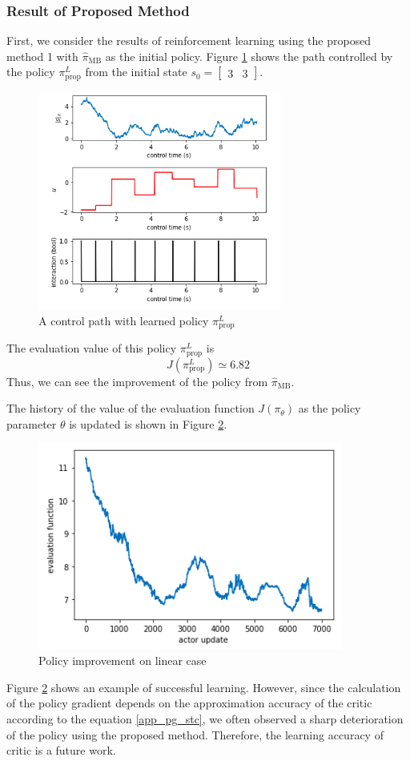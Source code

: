 \documentclass[english, dvipdfmx]{ampmt}             %
\begin{document}
\subsubsection{Result of Proposed Method}
First, we consider the results of reinforcement learning using the proposed method 1 with $\hat{\pi}_{\textrm{MB}}$ as the initial policy. Figure \ref{proposed_1_linear} shows the path controlled by the policy $\pi_{\textrm{prop}}^L$ from the initial state $s_0=\begin{bmatrix}3 & 3\end{bmatrix}$.
\begin{figure}[H]
	\centering
 	\includegraphics[width=8cm]{proposed_1_linear.png}
 	\caption{A control path with learned policy $\pi_{\textrm{prop}}^L$} \label{proposed_1_linear}
\end{figure}
The evaluation value of this policy $\pi_{\textrm{prop}}^L$ is
\begin{equation}
	J(\pi_{\textrm{prop}}^L) \simeq 6.82
\end{equation}
Thus, we can see the improvement of the policy from $\hat{\pi}_{\textrm{MB}}$.\par
The history of the value of the evaluation function $J( \pi_{\theta})$ as the policy parameter $\theta$ is updated is shown in Figure \ref{evaluation_log_linear}.
\begin{figure}[H]
	\centering
 	\includegraphics[width=10cm]{evaluation_log_linear.png}
 	\caption{Policy improvement on linear case} \label{evaluation_log_linear}
\end{figure}
Figure \ref{evaluation_log_linear} shows an example of successful learning. However, since the calculation of the policy gradient depends on the approximation accuracy of the critic according to the equation \eqref{app_pg_stc}, we often observed a sharp deterioration of the policy using the proposed method. Therefore, the learning accuracy of critic is a future work.
\end{document}
